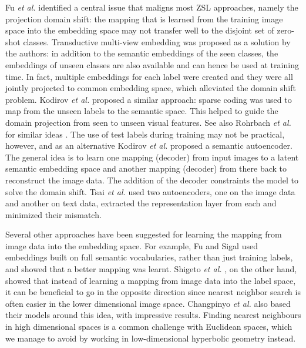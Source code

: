 \documentclass[12pt]{report}
\begin{document}
Fu \textit{et al.} \cite{Fu2015} identified a central issue that maligns most ZSL approaches, namely the projection domain shift: the mapping that is learned from the training image space into the embedding space may not transfer well to the disjoint set of zero-shot classes. Transductive multi-view embedding was proposed as a solution by the authors: in addition to the semantic embeddings of the seen classes, the embeddings of unseen classes are also available and can hence be used at training time. In fact, multiple embeddings for each label were created and they were all jointly projected to common embedding space, which alleviated the domain shift problem. Kodirov \textit{et al.} \cite{Kodirov2015} proposed a similar approach: sparse coding was used to map from the unseen labels to the semantic space. This helped to guide the domain projection from seen to unseen visual features. See also Rohrbach \textit{et al.} for similar ideas \cite{Rohrbach2013}. The use of test labels during training may not be practical, however, and as an alternative Kodirov \textit{et al.} \cite{Kodirov2017} proposed a semantic autoencoder. The general idea is to learn one mapping (decoder) from input images to a latent semantic embedding space and another mapping (decoder) from there back to reconstruct the image data. The addition of the decoder constraints the model to solve the domain shift. Tsai \textit{et al.} \cite{Tsai2016} used two autoencoders, one on the image data and another on text data, extracted the representation layer from each and minimized their mismatch. 

Several other approaches have been suggested for learning the mapping from image data into the embedding space. For example, Fu and Sigal \cite{Fu2016} used embeddings built on full semantic vocabularies, rather than just training labels, and showed that a better mapping was learnt. Shigeto \textit{et al.} \cite{Shigeto2015}, on the other hand, showed that instead of learning a mapping from image data into the label space, it can be beneficial to go in the opposite direction since nearest neighbor search is often easier in the lower dimensional image space. Changpinyo \textit{et al.} \cite{Changpinyo2017} also based their models around this idea, with impressive results. Finding nearest neighbours in high dimensional spaces is a common challenge with Euclidean spaces, which we manage to avoid by working in low-dimensional hyperbolic geometry instead.
\end{document}
